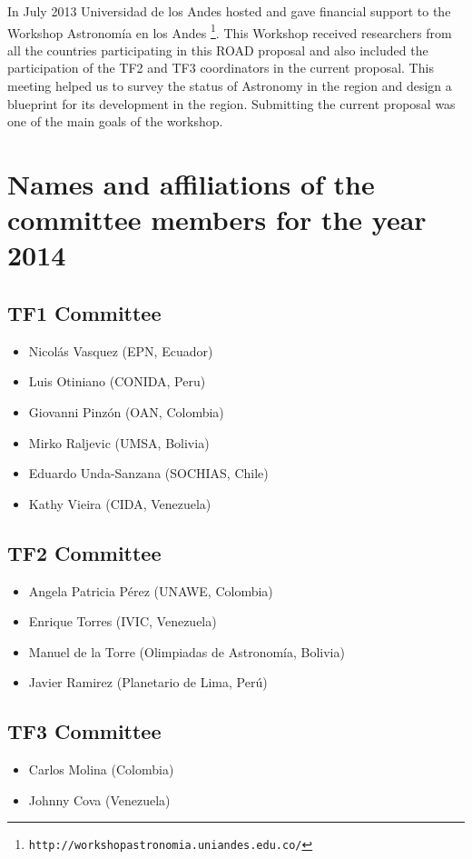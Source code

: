 \documentclass[12pt]{article}
\begin{document}
In July 2013 Universidad de los Andes hosted and gave financial
support to the Workshop Astronomía en los
Andes \footnote{\texttt{http://workshopastronomia.uniandes.edu.co/}}. This
Workshop received researchers from all the countries participating in
this ROAD proposal and also included the participation of the TF2 and
TF3 coordinators in the current proposal. This meeting helped us to
survey the status of Astronomy in the region and design a blueprint
for its development in the region. Submitting the current proposal was
one of the main goals of the workshop. 
 

\section{Names and affiliations of the committee members for the year 2014}

\subsection*{TF1 Committee}
\begin{itemize}
\item Nicol\'as Vasquez (EPN, Ecuador)
\item Luis Otiniano (CONIDA, Peru)
\item Giovanni Pinz\'on (OAN, Colombia)
\item Mirko Raljevic (UMSA, Bolivia)
\item Eduardo Unda-Sanzana (SOCHIAS, Chile)
\item Kathy Vieira (CIDA, Venezuela)
\end{itemize}

\subsection*{TF2 Committee}
\begin{itemize}
\item Angela Patricia Pérez (UNAWE, Colombia)
\item Enrique Torres  (IVIC, Venezuela)
\item Manuel de la Torre (Olimpiadas de Astronomía, Bolivia) 
\item Javier Ramirez (Planetario de Lima, Perú)
\end{itemize}

\subsection*{TF3 Committee}
\begin{itemize}
\item Carlos Molina (Colombia)
\item Johnny Cova (Venezuela)
\end{itemize}
\end{document}
